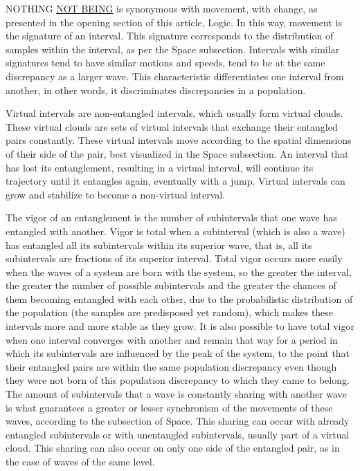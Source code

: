 NOTHING \underline{NOT BEING} is synonymous with movement, with change, as presented in the opening section of this article, Logic. In this way, movement is the signature of an interval. This signature corresponds to the distribution of samples within the interval, as per the Space subsection. Intervals with similar signatures tend to have similar motions and speeds, tend to be at the same discrepancy as a larger wave. This characteristic differentiates one interval from another, in other words, it discriminates discrepancies in a population.

Virtual intervals are non-entangled intervals, which usually form virtual clouds. These virtual clouds are sets of virtual intervals that exchange their entangled pairs constantly. These virtual intervals move according to the spatial dimensions of their side of the pair, best visualized in the Space subsection. An interval that has lost its entanglement, resulting in a virtual interval, will continue its trajectory until it entangles again, eventually with a jump. Virtual intervals can grow and stabilize to become a non-virtual interval.

The vigor of an entanglement is the number of subintervals that one wave has entangled with another. Vigor is total when a subinterval (which is also a wave) has entangled all its subintervals within its superior wave, that is, all its subintervals are fractions of its superior interval. Total vigor occurs more easily when the waves of a system are born with the system, so the greater the interval, the greater the number of possible subintervals and the greater the chances of them becoming entangled with each other, due to the probabilistic distribution of the population (the samples are predisposed yet random), which makes these intervals more and more stable as they grow. It is also possible to have total vigor when one interval converges with another and remain that way for a period in which its subintervals are influenced by the peak of the system, to the point that their entangled pairs are within the same population discrepancy even though they were not born of this population discrepancy to which they came to belong. The amount of subintervals that a wave is constantly sharing with another wave is what guarantees a greater or lesser synchronism of the movements of these waves, according to the subsection of Space. This sharing can occur with already entangled subintervals or with unentangled subintervals, usually part of a virtual cloud. This sharing can also occur on only one side of the entangled pair, as in the case of waves of the same level.

